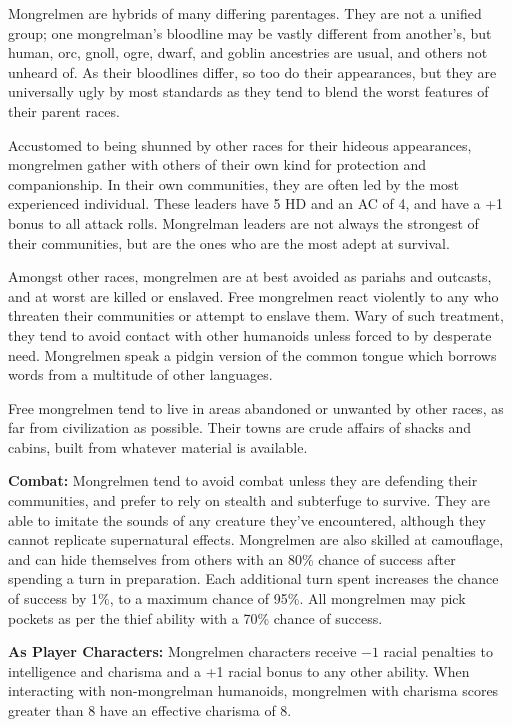 \begin{multicols}{2}
\begin{minipage}{\columnwidth}
\end{minipage}

Mongrelmen are hybrids of many differing parentages. They are not a unified group; one mongrelman's bloodline may be vastly different from another's, but human, orc, gnoll, ogre, dwarf, and goblin ancestries are usual, and others not unheard of. As their bloodlines differ, so too do their appearances, but they are universally ugly by most standards as they tend to blend the worst features of their parent races.

Accustomed to being shunned by other races for their hideous appearances, mongrelmen gather with others of their own kind for protection and companionship. In their own communities, they are often led by the most experienced individual. These leaders have 5 HD and an AC of 4, and have a +1 bonus to all attack rolls. Mongrelman leaders are not always the strongest of their communities, but are the ones who are the most adept at survival.

Amongst other races, mongrelmen are at best avoided as pariahs and outcasts, and at worst are killed or enslaved. Free mongrelmen react violently to any who threaten their communities or attempt to enslave them. Wary of such treatment, they tend to avoid contact with other humanoids unless forced to by desperate need. Mongrelmen speak a pidgin version of the common tongue which borrows words from a multitude of other languages.

Free mongrelmen tend to live in areas abandoned or unwanted by other races, as far from civilization as possible. Their towns are crude affairs of shacks and cabins, built from whatever material is available.

\textbf{Combat:} Mongrelmen tend to avoid combat unless they are defending their communities, and prefer to rely on stealth and subterfuge to survive. They are able to imitate the sounds of any creature they've encountered, although they cannot replicate supernatural effects. Mongrelmen are also skilled at camouflage, and can hide themselves from others with an 80\% chance of success after spending a turn in preparation. Each additional turn spent increases the chance of success by 1\%, to a maximum chance of 95\%. All mongrelmen may pick pockets as per the thief ability with a 70\% chance of success.

\textbf{As Player Characters:} Mongrelmen characters receive $-1$ racial penalties to intelligence and charisma and a +1 racial bonus to any other ability. When interacting with non-mongrelman humanoids, mongrelmen with charisma scores greater than 8 have an effective charisma of 8.


\end{multicols}
